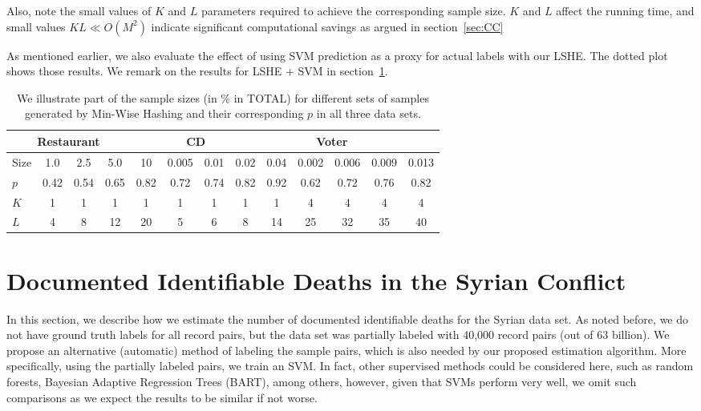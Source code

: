 \documentclass{imsart}
\begin{document}
Also, note the small values of $K$ and $L$ parameters required to achieve the corresponding sample size. $K$ and $L$ affect the running time, and small values $KL \ll O(M^2)$ indicate significant computational savings as argued in section~\ref{sec:CC}

As mentioned earlier, we also evaluate the effect of using SVM prediction as a proxy for actual labels with our LSHE. The dotted plot shows those results. We remark on the results for LSHE + SVM in section~\ref{syria}.

\begin{table}[ht]
	\centering
	\setlength\tabcolsep{0.18cm}
		\begin{tabular}{l|cccc|cccc|cccc}
			\toprule
			\multicolumn{4}{c}{\textbf{Restaurant}}&\multicolumn{4}{c}{\textbf{CD}}&\multicolumn{4}{c}{\textbf{Voter}}
			\\
			\midrule
			Size&1.0&2.5&5.0&10&0.005 & 0.01& 0.02 & 0.04&0.002&0.006&0.009&0.013
			\\
			
			$p$&0.42&0.54&0.65&0.82& 0.72& 0.74& 0.82& 0.92& 0.62&0.72& 0.76& 0.82
			\\
			
			$K$&1&1&1&1& 1& 1& 1& 1& 4& 4& 4& 4
			\\						
			
			$L$& 4 & 8 &12&20& 5& 6 & 8 & 14 &  25&  32&  35&40
			\\

			\bottomrule			
		\end{tabular}
			\caption{ We illustrate part of the sample sizes (in \% in TOTAL) for different sets of samples generated by Min-Wise Hashing and their corresponding $p$ in all three data sets. }
			\label{table2}
\end{table}




\section{Documented Identifiable Deaths in the Syrian Conflict}
\label{syria}
In this section, we describe how we estimate the number of documented identifiable deaths for the Syrian data set. As noted before, we do not have ground truth labels for all record pairs, but the data set was partially labeled with 40,000 record pairs (out of 63 billion). We propose an alternative (automatic) method of labeling the sample pairs, which is also needed by our proposed estimation algorithm. More specifically, using the partially labeled pairs, we train an SVM. In fact, other supervised methods could be considered here, such as random forests, Bayesian Adaptive Regression Trees (BART), among others, however, given that SVMs perform very well, we omit such comparisons as we expect the results to be similar if not worse.
\end{document}
